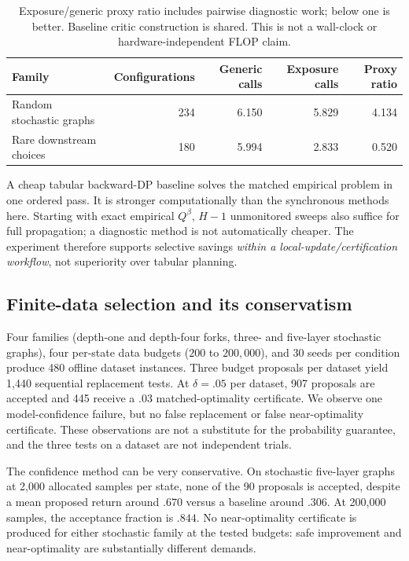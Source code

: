 \documentclass[11pt]{article}
\begin{document}
\begin{table}[t]
\centering\small
\begin{tabular}{lrrrr}
\toprule
Family & Configurations & Generic calls & Exposure calls & Proxy ratio\\
\midrule
Random stochastic graphs & 234 & 6.150 & 5.829 & 4.134\\
Rare downstream choices & 180 & 5.994 & 2.833 & 0.520\\
\bottomrule
\end{tabular}
\caption{Exposure/generic proxy ratio includes pairwise diagnostic work; below one is better. Baseline critic construction is shared. This is not a wall-clock or hardware-independent FLOP claim.}
\label{tab:work}
\end{table}
A cheap tabular backward-DP baseline solves the matched empirical problem in one ordered pass. It is stronger computationally than the synchronous methods here. Starting with exact empirical $Q^\beta$, $H-1$ unmonitored sweeps also suffice for full propagation; a diagnostic method is not automatically cheaper. The experiment therefore supports selective savings \emph{within a local-update/certification workflow}, not superiority over tabular planning.

\subsection{Finite-data selection and its conservatism}
Four families (depth-one and depth-four forks, three- and five-layer stochastic graphs), four per-state data budgets ($200$ to $200{,}000$), and 30 seeds per condition produce 480 offline dataset instances. Three budget proposals per dataset yield 1,440 sequential replacement tests. At $\delta=.05$ per dataset, 907 proposals are accepted and 445 receive a $.03$ matched-optimality certificate. We observe one model-confidence failure, but no false replacement or false near-optimality certificate. These observations are not a substitute for the probability guarantee, and the three tests on a dataset are not independent trials.

The confidence method can be very conservative. On stochastic five-layer graphs at 2,000 allocated samples per state, none of the 90 proposals is accepted, despite a mean proposed return around $.670$ versus a baseline around $.306$. At 200,000 samples, the acceptance fraction is $.844$. No near-optimality certificate is produced for either stochastic family at the tested budgets: safe improvement and near-optimality are substantially different demands.
\end{document}
